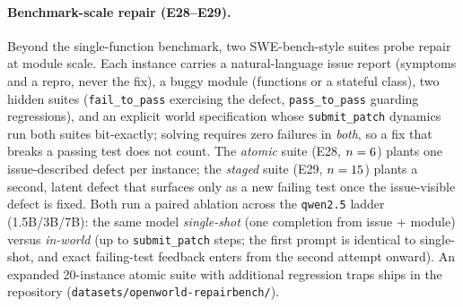 \documentclass[11pt]{article}
\begin{document}
\paragraph{Benchmark-scale repair (E28--E29).} Beyond the single-function
benchmark, two SWE-bench-style suites probe repair at module scale. Each
instance carries a natural-language issue report (symptoms and a repro, never
the fix), a buggy module (functions or a stateful class), two hidden suites
(\texttt{fail\_to\_pass} exercising the defect, \texttt{pass\_to\_pass}
guarding regressions), and an explicit world specification whose
\texttt{submit\_patch} dynamics run both suites bit-exactly; solving requires
zero failures in \emph{both}, so a fix that breaks a passing test does not
count. The \emph{atomic} suite (E28, $n=6$) plants one
issue-described defect per instance; the \emph{staged} suite (E29,
$n=15$) plants a second, latent defect that surfaces only as a new
failing test once the issue-visible defect is fixed. Both run a paired
ablation across the \texttt{qwen2.5} ladder (1.5B/3B/7B): the same model
\emph{single-shot} (one completion from issue + module) versus \emph{in-world}
(up to \SweBudget{} \texttt{submit\_patch} steps; the first prompt is
identical to single-shot, and exact failing-test feedback enters from the
second attempt onward). An expanded 20-instance atomic suite with additional
regression traps ships in the repository
(\texttt{datasets/openworld-repairbench/}).
\end{document}
